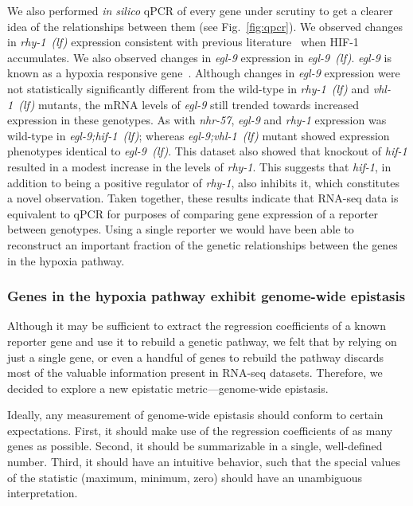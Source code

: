\documentclass[9pt,twocolumn,twoside]{pnas-new}
\newcommand{\gene}[1]{\emph{#1}}
\newcommand{\nhr}{\emph{nhr-57}}
\newcommand{\egl}{\emph{egl-9~(lf)}}
\newcommand{\rhy}{\emph{rhy-1~(lf)}}
\newcommand{\vhl}{\emph{vhl-1~(lf)}}
\newcommand{\eglvhl}{\emph{egl-9;vhl-1~(lf)}}
\newcommand{\eglhif}{\emph{egl-9;hif-1~(lf)}}
\newcommand{\hifp}{HIF-1}
\begin{document}
We also performed \emph{in silico} qPCR of every gene under scrutiny to get a
clearer idea of the relationships between them (see Fig.~\ref{fig:qpcr}). We
observed changes in \rhy{} expression consistent with previous
literature~\cite{Shen2006} when \hifp{} accumulates.
We also observed changes in \gene{egl-9} expression in \egl{}.
\gene{egl-9} is known as a hypoxia responsive gene~\cite{Powell-Coffman2010}.
Although changes in \gene{egl-9} expression were not statistically significantly
different from the wild-type in
\rhy{} and \vhl{} mutants, the mRNA levels of \gene{egl-9} still trended towards
increased expression in these genotypes. As with \nhr{}, \gene{egl-9} and
\gene{rhy-1} expression was wild-type in \eglhif{}; whereas \eglvhl{}
mutant showed expression phenotypes identical to \egl{}. This dataset also showed
that knockout of \gene{hif-1} resulted in a modest increase in
the levels of \gene{rhy-1}. This suggests that \gene{hif-1}, in addition to being
a positive regulator of \gene{rhy-1}, also inhibits it, which constitutes a novel
observation. Taken together, these results indicate that RNA-seq data is
equivalent to qPCR for purposes of comparing gene expression of a reporter between
genotypes. Using a single reporter we would have been able to reconstruct an
important fraction of the genetic relationships between the genes in the hypoxia
pathway.

\subsubsection*{Genes in the hypoxia pathway exhibit genome-wide epistasis}
Although it may be sufficient to extract the regression coefficients of a
known reporter gene and use it to rebuild a genetic pathway, we felt that by
relying on just a single gene, or even a handful of genes to rebuild the pathway
discards most of the valuable information present in RNA-seq datasets. Therefore,
we decided to explore a new epistatic metric---genome-wide epistasis.

Ideally, any measurement of genome-wide epistasis should conform to certain
expectations. First, it should make use of the regression coefficients of as
many genes as possible. Second, it should be summarizable in a single,
well-defined number. Third, it should have an intuitive behavior, such that
the special values of the statistic (maximum, minimum, zero) should have an
unambiguous interpretation.
\end{document}
